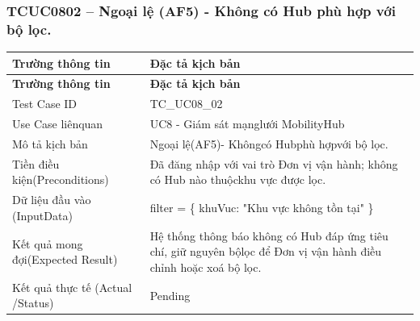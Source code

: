 \subsubsection{TCUC0802 – Ngoại lệ (AF5) - Không có Hub phù hợp với bộ lọc.}
\begin{longtable}{|L{0.24\textwidth}|L{0.70\textwidth}|}
\hline
\textbf{Trường thông tin} & \textbf{Đặc tả kịch bản} \\
\hline
\endfirsthead
\hline
\textbf{Trường thông tin} & \textbf{Đặc tả kịch bản} \\
\hline
\endhead
Test Case ID & TC\_UC08\_02 \\
\hline
Use Case liênquan & UC8 - Giám sát mạnglưới MobilityHub \\
\hline
Mô tả kịch bản & Ngoại lệ(AF5)- Khôngcó Hubphù hợpvới bộ lọc. \\
\hline
Tiền điều kiện\newline (Preconditions) & Đã đăng nhập với vai trò Đơn vị vận hành; không có Hub nào thuộc\newline khu vực được lọc. \\
\hline
Dữ liệu đầu vào (Input\newline Data) & filter = \{ khuVuc: "Khu vực không tồn tại" \} \\
\hline
Kết quả mong đợi\newline (Expected Result) & Hệ thống thông báo không có Hub đáp ứng tiêu chí, giữ nguyên bộ\newline lọc để Đơn vị vận hành điều chỉnh hoặc xoá bộ lọc. \\
\hline
Kết quả thực tế (Actual /\newline Status) & Pending \\
\hline
\end{longtable}
\vspace{-0.5\baselineskip}
